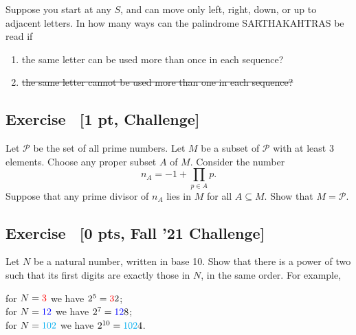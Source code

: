 \documentclass{article}
\newcounter{counter}
\newcommand{\Exercise}{Exercise \stepcounter{counter}\thecounter}
\begin{document}
    Suppose you start at any $S$, and can move only left, right, down, or up to adjacent letters. In how many ways can the palindrome SARTHAKAHTRAS be read if
    \begin{enumerate}
        \item the same letter can be used more than once in each sequence?
        \item \st{the same letter cannot be used more than one in each sequence?}
    \end{enumerate}

\subsection*{\Exercise \ {\bf [1 pt, Challenge]}}
    Let $\mathcal{P}$ be the set of all prime numbers. Let $M$ be a subset of $\mathcal{P}$ with at least $3$ elements. Choose any proper subset $A$ of $M$. Consider the number $$n_{A} = -1 + \prod_{p \in A} p.$$ Suppose that any prime divisor of $n_{A}$ lies in $M$ for all $A \subseteq M$. Show that $M = \mathcal{P}$.

\subsection*{\Exercise \ [0 pts, Fall '21 Challenge]}
    Let $N$ be a natural number, written in base 10. Show that there is a power of two such that its first digits are exactly those in $N$, in the same order. For example,
    
    \vspace{1.5mm}
    for $N = \textcolor{red}{3}$ we have $2^{5} = \textcolor{red}{3}2$; \\
    for $N = \textcolor{blue}{12}$ we have $2^{7} = \textcolor{blue}{12}8$; \\
    for $N = \textcolor{cyan}{102}$ we have $2^{10} = \textcolor{cyan}{102}4$.
\end{document}
